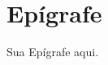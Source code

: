 \clearpage
\pagestyle{fancy}
\fancyhead{}
\fancyhead[RO,LE]{\thepage}
\fancyfoot{}
\fancyfoot[LE,RO]{}
\fancyfoot[LO,CE]{}
\fancyfoot[CO,RE]{}
\vspace*{0.7cm}
\section*{\hfill Epígrafe}
\vspace*{\fill}
\begin{flushright}
Sua Epígrafe aqui.
\end{flushright}

